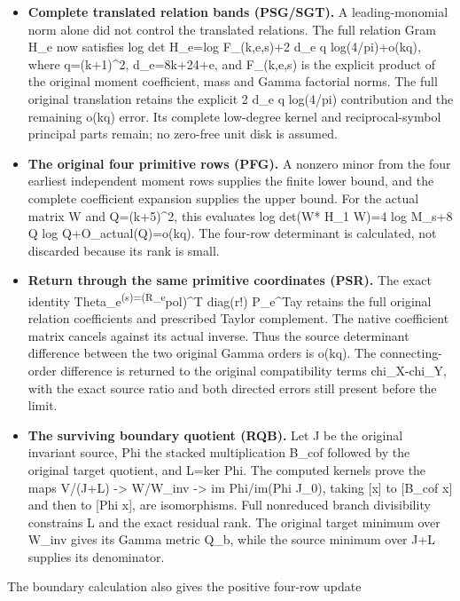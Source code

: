 \documentclass[
]{article}
\providecommand{\tightlist}{%
  \setlength{\itemsep}{0pt}\setlength{\parskip}{0pt}}
\begin{document}
\begin{itemize}
\tightlist
\item
  \textbf{Complete translated relation bands (PSG/SGT).} A
  leading-monomial norm alone did not control the translated relations.
  The full relation Gram H\_e now satisfies log det H\_e=log
  F\_(k,e,s)+2 d\_e q log(4/pi)+o(kq), where q=(k+1)\^{}2, d\_e=8k+24+e,
  and F\_(k,e,s) is the explicit product of the original moment
  coefficient, mass and Gamma factorial norms. The full original
  translation retains the explicit 2 d\_e q log(4/pi) contribution and
  the remaining o(kq) error. Its complete low-degree kernel and
  reciprocal-symbol principal parts remain; no zero-free unit disk is
  assumed.
\item
  \textbf{The original four primitive rows (PFG).} A nonzero minor from
  the four earliest independent moment rows supplies the finite lower
  bound, and the complete coefficient expansion supplies the upper
  bound. For the actual matrix W and Q=(k+5)\^{}2, this evaluates log
  det(W* H\_1 W)=4 log M\_s+8 Q log Q+O\_actual(Q)=o(kq). The four-row
  determinant is calculated, not discarded because its rank is small.
\item
  \textbf{Return through the same primitive coordinates (PSR).} The
  exact identity Theta\_e\textsuperscript{(s)=(R\_e}pol)\^{}T diag(r!)
  P\_e\^{}Tay retains the full original relation coefficients and
  prescribed Taylor complement. The native coefficient matrix cancels
  against its actual inverse. Thus the source determinant difference
  between the two original Gamma orders is o(kq). The connecting-order
  difference is returned to the original compatibility terms
  chi\_X-chi\_Y, with the exact source ratio and both directed errors
  still present before the limit.
\item
  \textbf{The surviving boundary quotient (RQB).} Let J be the original
  invariant source, Phi the stacked multiplication B\_cof followed by
  the original target quotient, and L=ker Phi. The computed kernels
  prove the maps V/(J+L) -\textgreater{} W/W\_inv -\textgreater{} im
  Phi/im(Phi J\_0), taking {[}x{]} to {[}B\_cof x{]} and then to {[}Phi
  x{]}, are isomorphisms. Full nonreduced branch divisibility constrains
  L and the exact residual rank. The original target minimum over W\_inv
  gives its Gamma metric Q\_b, while the source minimum over J+L
  supplies its denominator.
\end{itemize}

The boundary calculation also gives the positive four-row update
\end{document}
